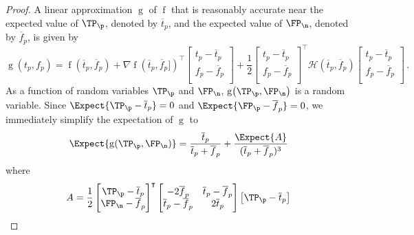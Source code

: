\documentclass[ ../main.tex]{subfiles}
\begin{document}
{\begin{proof}
A linear approximation $\operatorname{g}$ of $\operatorname{f}$ that is reasonably accurate near the expected value of $\TP_\p$, denoted by $\overline{t}_p$, and the expected value of $\FP_\n$, denoted by $\overline{f}_p$, is given by
\begin{equation}
    \operatorname{g}(t_p,f_p) =
    \operatorname{f}\left(\overline{t}_p,\overline{f}_p\right) + \nabla{\operatorname{f}}(\overline{t}_p,\overline{f}_p])^{\intercal}
    \begin{bmatrix}
        t_p - \overline{t}_p\\
        f_p - \overline{f}_p\\
    \end{bmatrix}
    + \frac{1}{2}
    \begin{bmatrix}
        t_p - \overline{t}_p\\
        f_p - \overline{f}_p\\
    \end{bmatrix}^{\intercal}
    \mathcal{H}(\overline{t}_p,\overline{f}_p)
    \begin{bmatrix}
        t_p - \overline{t}_p\\
        f_p - \overline{f}_p\\
    \end{bmatrix}\,.
\end{equation}
As a function of random variables $\TP_\p$ and $\FP_\n$, $\operatorname{g}\!\left(\TP_\p,\FP_\n\right)$ is a random variable. Since $\Expect{\TP_\p - \overline{t}_p} = 0$ and $\Expect{\FP_\p - \overline{f}_p} = 0$, we immediately simplify the expectation of $\operatorname{g}$ to
\begin{equation}
\label{eq:proof_hess1}
    \Expect{\operatorname{g}(\TP_\p,\FP_\n)} = \frac{\overline{t}_p}{\overline{t}_p+\overline{f}_p} + \frac{\Expect{A}}{(\overline{t}_p + \overline{f}_p)^3}
\end{equation}
where
\begin{equation}
    A = \frac{1}{2}
    \begin{bmatrix}
        \TP_\p - \overline{t}_p\\
        \FP_\n - \overline{f}_p
    \end{bmatrix}^{\intercal}
    \begin{bmatrix}
        -2 \overline{f}_p & \overline{t}_p-\overline{f}_p\\
        \overline{t}_p-\overline{f}_p & 2 \overline{t}_p
    \end{bmatrix}
    \begin{bmatrix}
        \TP_\p - \overline{t}_p\\

\end{bmatrix}
\end{equation}
\end{proof}}
\end{document}
